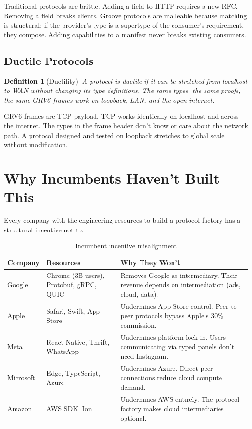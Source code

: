 \documentclass[11pt,a4paper]{article}
\newtheorem{definition}{Definition}
\begin{document}
Traditional protocols are brittle. Adding a field to HTTP requires a
new RFC. Removing a field breaks clients. Groove protocols are malleable
because matching is structural: if the provider's type is a supertype of
the consumer's requirement, they compose. Adding capabilities to a
manifest never breaks existing consumers.

\subsection{Ductile Protocols}

\begin{definition}[Ductility]
A protocol is \emph{ductile} if it can be stretched from localhost to
WAN without changing its type definitions. The same types, the same
proofs, the same GRV6 frames work on loopback, LAN, and the open
internet.
\end{definition}

GRV6 frames are TCP payload. TCP works identically on localhost and
across the internet. The types in the frame header don't know or care
about the network path. A protocol designed and tested on loopback
stretches to global scale without modification.

\section{Why Incumbents Haven't Built This}

Every company with the engineering resources to build a protocol factory
has a structural incentive not to.

\begin{table}[h]
\centering
\small
\begin{tabular}{lp{3cm}p{5cm}}
\toprule
Company & Resources & Why They Won't \\
\midrule
Google & Chrome (3B users), Protobuf, gRPC, QUIC
  & Removes Google as intermediary. Their revenue depends on
    intermediation (ads, cloud, data). \\
Apple & Safari, Swift, App Store
  & Undermines App Store control. Peer-to-peer protocols bypass
    Apple's 30\% commission. \\
Meta & React Native, Thrift, WhatsApp
  & Undermines platform lock-in. Users communicating via typed
    panels don't need Instagram. \\
Microsoft & Edge, TypeScript, Azure
  & Undermines Azure. Direct peer connections reduce cloud compute
    demand. \\
Amazon & AWS SDK, Ion
  & Undermines AWS entirely. The protocol factory makes cloud
    intermediaries optional. \\
\bottomrule
\end{tabular}
\caption{Incumbent incentive misalignment}
\label{tab:incumbents}
\end{table}
\end{document}
